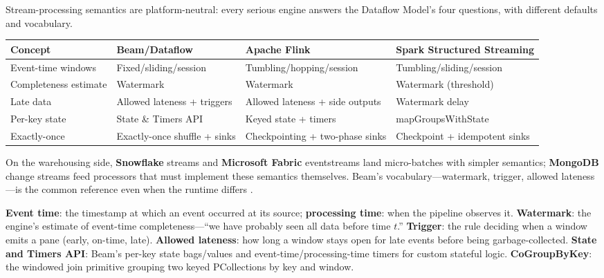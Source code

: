 \begin{crosscloud}
Stream-processing semantics are platform-neutral: every serious engine answers the Dataflow Model's four questions, with different defaults and vocabulary.

\vspace{2mm}
{\footnotesize
\begin{tabular}{@{}p{2.8cm}p{3.0cm}p{3.0cm}p{3.0cm}@{}} \\
\toprule
\textbf{Concept} & \textbf{Beam/Dataflow} & \textbf{Apache Flink} & \textbf{Spark Structured Streaming} \\
\midrule
Event-time windows & Fixed/sliding/session & Tumbling/hopping/session & Tumbling/sliding/session \\
Completeness estimate & Watermark & Watermark & Watermark (threshold) \\
Late data & Allowed lateness + triggers & Allowed lateness + side outputs & Watermark delay \\
Per-key state & State \& Timers API & Keyed state + timers & mapGroupsWithState \\
Exactly-once & Exactly-once shuffle + sinks & Checkpointing + two-phase sinks & Checkpoint + idempotent sinks \\
\bottomrule
\end{tabular}}

\vspace{1mm}
On the warehousing side, \textbf{Snowflake} streams and \textbf{Microsoft Fabric} eventstreams land micro-batches with simpler semantics; \textbf{MongoDB} change streams feed processors that must implement these semantics themselves. Beam's vocabulary---watermark, trigger, allowed lateness---is the common reference even when the runtime differs \cite{akidau2015dataflow}.
\end{crosscloud}

\begin{keyterms}
\textbf{Event time}: the timestamp at which an event occurred at its source; \textbf{processing time}: when the pipeline observes it.
\textbf{Watermark}: the engine's estimate of event-time completeness---``we have probably seen all data before time $t$.''
\textbf{Trigger}: the rule deciding when a window emits a pane (early, on-time, late).
\textbf{Allowed lateness}: how long a window stays open for late events before being garbage-collected.
\textbf{State and Timers API}: Beam's per-key state bags/values and event-time/processing-time timers for custom stateful logic.
\textbf{CoGroupByKey}: the windowed join primitive grouping two keyed PCollections by key and window.
\end{keyterms}


